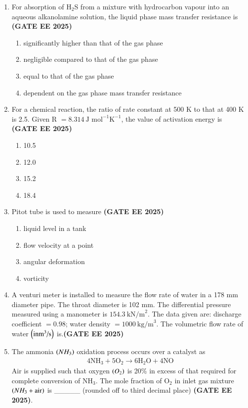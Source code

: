 \documentclass[journal,12pt,onecolumn]{IEEEtran}
\theoremstyle{remark}
\begin{document}
\begin{enumerate}
\item For absorption of H$_2$S from a mixture with hydrocarbon vapour into an aqueous alkanolamine solution, the liquid phase mass transfer resistance is
\hfill \textbf{(GATE EE 2025)} \begin{enumerate}
    \item significantly higher than that of the gas phase
    \item negligible compared to that of the gas phase
    \item equal to that of the gas phase
    \item dependent on the gas phase mass transfer resistance
\end{enumerate}


\item  For a chemical reaction, the ratio of rate constant at 500 K to that at 400 K is 2.5. Given R $=8.314~\text{J mol}^{-1}\text{K}^{-1}$, the value of activation energy  is
\hfill \textbf{(GATE EE 2025)} \begin{enumerate}
    \item 10.5
    \item 12.0
    \item 15.2
    \item 18.4
\end{enumerate}


\item  Pitot tube is used to measure
\hfill \textbf{(GATE EE 2025)} \begin{enumerate}
    \item liquid level in a tank
    \item flow velocity at a point
    \item angular deformation
    \item vorticity
\end{enumerate}


\item A venturi meter is installed to measure the flow rate of water in a 178 mm diameter  pipe. The throat diameter is 102 mm. The differential pressure measured using a manometer is $154.3~\text{kN/m}^{2}.$ The data given are: discharge coefficient $=0.98$; water density $=1000~\text{kg/m}^{3}$.
The volumetric flow rate of water $\left(\text{in} \text{m}^{3}\text{/s}\right)$ is\underline{\hspace{2cm}}.\hfill \textbf{(GATE EE 2025)}

\item The ammonia $\left(NH_{3}\right)$ oxidation process occurs over a catalyst as
\begin{align*}
    4\text{NH}_{3}+5\text{O}_{2}\rightarrow6\text{H}_{2}\text{O}+4\text{NO}
\end{align*}  
Air is supplied such that oxygen $\left(O_2\right)$ is 20\% in excess of that required for complete conversion of NH$_3$. The mole fraction of O$_2$ in inlet gas mixture $\left(NH_3 + \text{air}\right)$ is \_\_\_\_\_ (rounded off to third decimal place) \hfill \textbf{(GATE EE 2025)}.



\end{enumerate}
\end{document}
